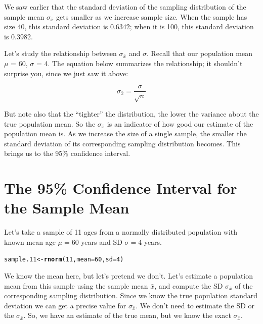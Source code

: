 \documentclass[12pt]{book}\usepackage[]{graphicx}\usepackage[]{color}
\makeatletter
\newcommand{\hlnum}[1]{\textcolor[rgb]{0.686,0.059,0.569}{#1}}%
\newcommand{\hlstd}[1]{\textcolor[rgb]{0.345,0.345,0.345}{#1}}%
\newcommand{\hlkwb}[1]{\textcolor[rgb]{0.69,0.353,0.396}{#1}}%
\newcommand{\hlkwc}[1]{\textcolor[rgb]{0.333,0.667,0.333}{#1}}%
\newcommand{\hlkwd}[1]{\textcolor[rgb]{0.737,0.353,0.396}{\textbf{#1}}}%
\newenvironment{kframe}{%
 \def\at@end@of@kframe{}%
 \ifinner\ifhmode%
  \def\at@end@of@kframe{\end{minipage}}%
  \begin{minipage}{\columnwidth}%
 \fi\fi%
 \def\FrameCommand##1{\hskip\@totalleftmargin \hskip-\fboxsep
 \colorbox{shadecolor}{##1}\hskip-\fboxsep
     \hskip-\linewidth \hskip-\@totalleftmargin \hskip\columnwidth}%
 \MakeFramed {\advance\hsize-\width
   \@totalleftmargin\z@ \linewidth\hsize
   \@setminipage}}%
 {\par\unskip\endMakeFramed%
 \at@end@of@kframe}
\newenvironment{knitrout}{}{} %
\makeatother
\begin{document}
We saw earlier that the standard deviation of the sampling
distribution of the sample mean $\sigma_{\bar{x}}$ gets
smaller as we increase sample size. When the sample has size 40, this
standard deviation is 0.6342; when it
is 100, this standard deviation is
0.3982.

Let's study the relationship between $\sigma_{\bar{x}}$ and $\sigma$.
Recall that our population mean $\mu$ = 60, $\sigma$ = 4.  The equation below
summarizes the relationship; it shouldn't surprise you, since we just
saw it above:

\begin{equation}
\sigma_{\bar{x}} = \frac{\sigma}{\sqrt{n}}
\end{equation}

But note also that the ``tighter'' the distribution, the lower the variance about the true population mean.  So the $\sigma_{\bar{x}}$  is an
indicator of how good our estimate of the population mean is.
As we increase the size of a single sample, the smaller the standard
deviation of its corresponding sampling distribution becomes. This brings us to the 95\% confidence interval.

\section {The 95\% Confidence Interval for the Sample Mean}

Let's take a sample of 11 ages from a normally distributed population
with known mean age $\mu = 60$ years and SD $\sigma = 4$ years.

\begin{knitrout}
\color{fgcolor}\begin{kframe}
\begin{alltt}
\hlstd{sample.11} \hlkwb{<-} \hlkwd{rnorm}\hlstd{(}\hlnum{11}\hlstd{,}\hlkwc{mean}\hlstd{=}\hlnum{60}\hlstd{,}\hlkwc{sd}\hlstd{=}\hlnum{4}\hlstd{)}
\end{alltt}
\end{kframe}
\end{knitrout}

We know the mean here, but let's pretend we don't.
Let's estimate a population mean from this sample using the sample
mean $\bar{x}$, and compute the SD $\sigma_{\bar{x}}$ of the corresponding sampling distribution. 
Since we know the
true population standard deviation we can get a precise value
for $\sigma_{\bar{x}}$. We don't need to estimate the SD or the $\sigma_{\bar{x}}$.
So, we have an estimate of the true mean, but we know the exact  $\sigma_{\bar{x}}$.
\end{document}
